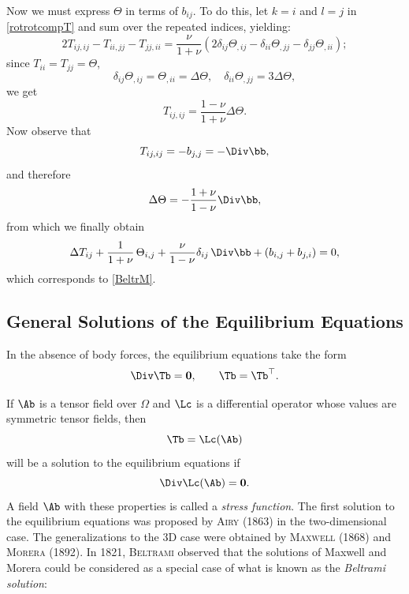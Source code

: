 Now we must express $\Theta$ in terms of $b_{ij}$. To do this, let $k = i$ and $l = j$ in \eqref{rotrotcompT} and sum over the repeated indices, yielding:
\begin{equation}
	2 T_{ij,ij} - T_{ii,jj} - T_{jj,ii} = \frac{\nu}{1+\nu} \left( 2 \delta_{ij} \Theta_{,ij} - \delta_{ii} \Theta_{,jj} - \delta_{jj} \Theta_{,ii} \right);
\end{equation}
since $T_{ii} = T_{jj} = \Theta$,
\begin{equation}
	\delta_{ij} \Theta_{,ij} = \Theta_{,ii} = \Delta \Theta, \quad \delta_{ii} \Theta_{,jj} = 3 \Delta \Theta,
\end{equation}
we get
\begin{equation}
	T_{ij,ij} = \frac{1-\nu}{1+\nu} \Delta \Theta.
\end{equation}
Now observe that 
\begin{equation}
	T_{ij,ij} = -b_{j,j} = -\Div \bb,
\end{equation}
and therefore
\begin{equation}
	\Delta \Theta = -\frac{1+\nu}{1-\nu} \Div \bb,
\end{equation}
from which we finally obtain
\begin{equation}
	\Delta T_{ij}+\frac{1}{1+\nu}\, \Theta_{i,j}+\frac{\nu}{1-\nu}\delta_{ij}\, \Div \bb+(b_{i,j}+b_{j,i})=0,
\end{equation}
which corresponds to \eqref{BeltrM}.


\subsection{General Solutions of the Equilibrium Equations}
In the absence of body forces, the equilibrium equations take the form
\begin{equation}
	\Div \Tb = \mathbf{0}, \qquad \Tb = \Tb^\top.
\end{equation}

If $\Ab$ is a tensor field over $\Omega$ and $\Lc$ is a differential operator whose values are symmetric tensor fields, then
\begin{equation}
	\Tb = \Lc(\Ab)
\end{equation}
will be a solution to the equilibrium equations if 
\begin{equation}
	\Div \Lc(\Ab) = \mathbf{0}.
\end{equation}
A field $\Ab$ with these properties is called a \textit{stress function}. The first solution to the equilibrium equations was proposed by \textsc{Airy} (1863) in the two-dimensional case. The generalizations to the 3D case were obtained by \textsc{Maxwell} (1868) and \textsc{Morera} (1892). In 1821, \textsc{Beltrami} observed that the solutions of Maxwell and Morera could be considered as a special case of what is known as the \textit{Beltrami solution}:

